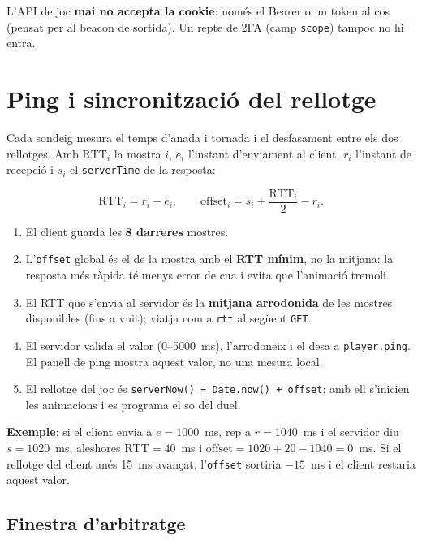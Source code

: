 \documentclass[10pt,a4paper]{article}
\begin{document}
L'API de joc \textbf{mai no accepta la cookie}: només el Bearer o un token al cos
(pensat per al beacon de sortida). Un repte de 2FA (camp \texttt{scope}) tampoc no hi
entra.

\section{Ping i sincronització del rellotge}

Cada sondeig mesura el temps d'anada i tornada i el desfasament entre els dos
rellotges. Amb $\mathrm{RTT}_i$ la mostra $i$, $e_i$ l'instant d'enviament al client,
$r_i$ l'instant de recepció i $s_i$ el \texttt{serverTime} de la resposta:

\[
  \mathrm{RTT}_i = r_i - e_i,
  \qquad
  \mathrm{offset}_i = s_i + \frac{\mathrm{RTT}_i}{2} - r_i.
\]

\begin{enumerate}[nosep]
  \item El client guarda les \textbf{8 darreres} mostres.
  \item L'\texttt{offset} global és el de la mostra amb el \textbf{RTT mínim}, no la
        mitjana: la resposta més ràpida té menys error de cua i evita que l'animació
        tremoli.
  \item El RTT que s'envia al servidor és la \textbf{mitjana arrodonida} de les mostres
        disponibles (fins a vuit); viatja com a \texttt{rtt} al següent \texttt{GET}.
  \item El servidor valida el valor (0--5000~ms), l'arrodoneix i el desa a
        \texttt{player.ping}. El panell de ping mostra aquest valor, no una mesura
        local.
  \item El rellotge del joc és \texttt{serverNow() = Date.now() + offset}; amb ell
        s'inicien les animacions i es programa el so del duel.
\end{enumerate}

\textbf{Exemple}: si el client envia a $e=1000$~ms, rep a $r=1040$~ms i el servidor diu
$s=1020$~ms, aleshores $\mathrm{RTT}=40$~ms i
$\mathrm{offset}=1020+20-1040=0$~ms. Si el rellotge del client anés 15~ms avançat,
l'\texttt{offset} sortiria $-15$~ms i el client restaria aquest valor.

\subsection*{Finestra d'arbitratge}
\end{document}
